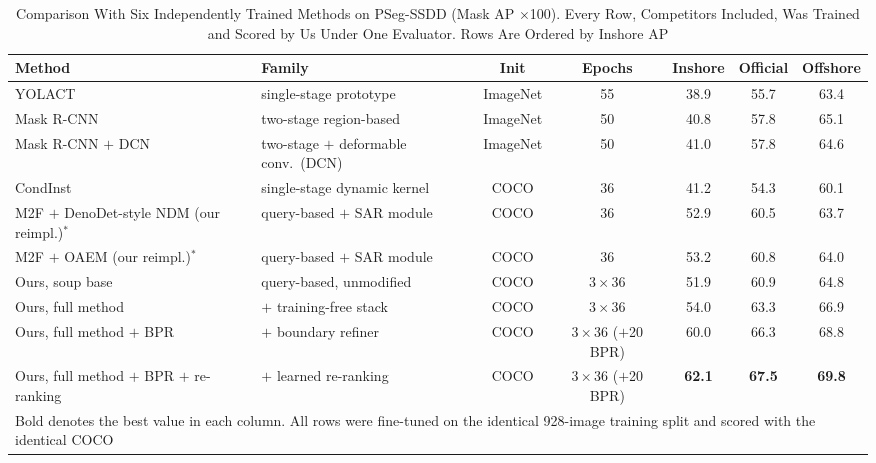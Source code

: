 \begin{table}[!t]
\caption{Comparison With Six Independently Trained Methods on PSeg-SSDD (Mask AP $\times$100). Every Row, Competitors Included, Was Trained and Scored by Us Under One Evaluator. Rows Are Ordered by Inshore AP}
\label{tab:ssdd_cmp}
\centering
\footnotesize
\setlength{\tabcolsep}{4pt}
\begin{tabular}{llccccc}
\toprule
Method & Family & Init & Epochs & Inshore & Official & Offshore \\
\midrule
YOLACT \cite{yolact2019} & single-stage prototype & ImageNet & 55 & 38.9 & 55.7 & 63.4 \\
Mask R-CNN \cite{maskrcnn2017} & two-stage region-based & ImageNet & 50 & 40.8 & 57.8 & 65.1 \\
Mask R-CNN $+$ DCN \cite{dcnv22018} & two-stage $+$ deformable conv.\ (DCN) & ImageNet & 50 & 41.0 & 57.8 & 64.6 \\
CondInst \cite{condinst2020} & single-stage dynamic kernel & COCO & 36 & 41.2 & 54.3 & 60.1 \\
M2F $+$ DenoDet-style NDM (our reimpl.)$^{\ast}$ \cite{denodetv22026} & query-based $+$ SAR module & COCO & 36 & 52.9 & 60.5 & 63.7 \\
M2F $+$ OAEM (our reimpl.)$^{\ast}$ \cite{o2former2025} & query-based $+$ SAR module & COCO & 36 & 53.2 & 60.8 & 64.0 \\
\midrule
Ours, soup base & query-based, unmodified & COCO & $3\times36$ & 51.9 & 60.9 & 64.8 \\
Ours, full method & $+$ training-free stack & COCO & $3\times36$ & 54.0 & 63.3 & 66.9 \\
Ours, full method $+$ BPR & $+$ boundary refiner & COCO & $3\times36$ ($+$20 BPR) & 60.0 & 66.3 & 68.8 \\
Ours, full method $+$ BPR $+$ re-ranking & $+$ learned re-ranking & COCO & $3\times36$ ($+$20 BPR) & \textbf{62.1} & \textbf{67.5} & \textbf{69.8} \\
\bottomrule
\multicolumn{7}{l}{\footnotesize Bold denotes the best value in each column. All rows were fine-tuned on the identical 928-image training split and scored with the identical COCO} \\

\end{tabular}
\end{table}
